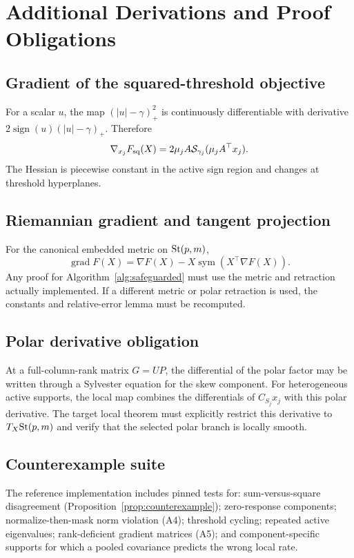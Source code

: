 \section{Additional Derivations and Proof Obligations}
\label{sec:appendix}
\subsection{Gradient of the squared-threshold objective}
For a scalar \(u\), the map \((|u|-\gamma)_+^2\) is continuously differentiable with derivative \(2\operatorname{sign}(u)(|u|-\gamma)_+\). Therefore
\[
\nabla_{x_j}F_{\mathrm{sq}}(X)=2\mu_jA\mathcal{S}_{\gamma_j}(\mu_jA^\top x_j).
\]
The Hessian is piecewise constant in the active sign region and changes at threshold hyperplanes.

\subsection{Riemannian gradient and tangent projection}
For the canonical embedded metric on \(\mathrm{St}(p,m)\),
\[
\operatorname{grad}F(X)=\nabla F(X)-X\operatorname{sym}(X^\top\nabla F(X)).
\]
Any proof for Algorithm~\ref{alg:safeguarded} must use the metric and retraction actually implemented. If a different metric or polar retraction is used, the constants and relative-error lemma must be recomputed.

\subsection{Polar derivative obligation}
At a full-column-rank matrix \(G=UP\), the differential of the polar factor may be written through a Sylvester equation for the skew component. For heterogeneous active supports, the local map combines the differentials of \(C_{S_j}x_j\) with this polar derivative. The target local theorem must explicitly restrict this derivative to \(T_X\mathrm{St}(p,m)\) and verify that the selected polar branch is locally smooth.

\subsection{Counterexample suite}
The reference implementation includes pinned tests for: sum-versus-square disagreement (Proposition~\ref{prop:counterexample}); zero-response components; normalize-then-mask norm violation (A4); threshold cycling; repeated active eigenvalues; rank-deficient gradient matrices (A5); and component-specific supports for which a pooled covariance predicts the wrong local rate.


